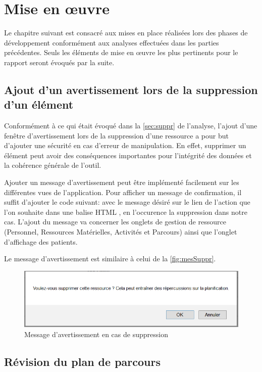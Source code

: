 \documentclass[noposter]{polytech/polytech}
\begin{document}
\chapter{Mise en œuvre}


Le chapitre suivant est consacré aux mises en place réalisées lors des phases de développement conformément aux analyses effectuées dans les parties précédentes. Seuls les éléments de mise en œuvre les plus pertinents pour le rapport seront évoqués par la suite.


\section{Ajout d'un avertissement lors de la suppression d'un élément}


Conformément à ce qui était évoqué dans la \autoref{sec:suppr} de l'analyse, l'ajout d'une fenêtre d'avertissement lors de la suppression d'une ressource a pour but d'ajouter une sécurité en cas d'erreur de manipulation. En effet, supprimer un élément peut avoir des conséquences importantes pour l'intégrité des données et la cohérence générale de l'outil. 

Ajouter un message d'avertissement peut être implémenté facilement sur les différentes vues de l'application. Pour afficher un message de confirmation, il suffit d'ajouter le code suivant:  avec le message désiré sur le lien de l'action que l'on souhaite dans une balise HTML , en l'occurence la suppression dans notre cas. L'ajout du message va concerner les onglets de gestion de ressource (Personnel, Ressources Matérielles, Activités et Parcours) ainsi que l'onglet d'affichage des patients. 

Le message d'avertissement est similaire à celui de la \autoref{fig:mesSuppr}.

\begin{figure}
	\includegraphics[scale=1]{images/messSuppr}
	\caption{Message d'avertissement en cas de suppression}
	\label{fig:mesSuppr}
\end{figure}


\section{Révision du plan de parcours}
\end{document}
